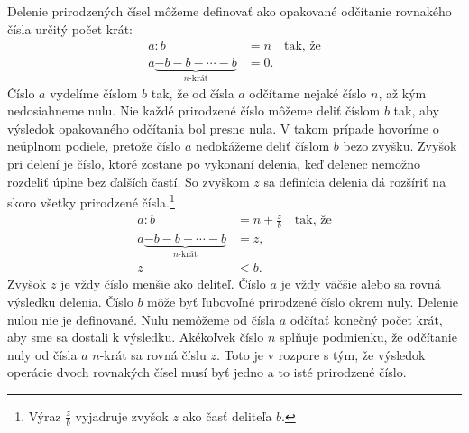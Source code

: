 \documentclass{report}
\begin{document}
Delenie prirodzených čísel môžeme definovať ako opakované odčítanie rovnakého čísla určitý počet krát:
\[
\begin{aligned}
  a : b &= n \quad \text{tak, že}\\
  a \underbrace{- b - b - \cdots - b}_{n\text{-krát}} &= 0.
\end{aligned}
\]
Číslo \(a\) vydelíme číslom \(b\) tak, že od čísla \(a\) odčítame nejaké číslo \(n\), až kým nedosiahneme nulu. Nie každé prirodzené číslo môžeme deliť číslom \(b\) tak, aby výsledok opakovaného odčítania bol presne nula. V takom prípade hovoríme o neúplnom podiele, pretože číslo \(a\) nedokážeme deliť číslom \(b\) bezo zvyšku. Zvyšok pri delení je číslo, ktoré zostane po vykonaní delenia, keď delenec nemožno rozdeliť úplne bez ďalších častí. So zvyškom \(z\) sa definícia delenia dá rozšíriť na skoro všetky prirodzené čísla.\footnote{Výraz \(\frac{z}{b}\) vyjadruje zvyšok \(z\) ako časť deliteľa \(b\).}
\[
\begin{aligned}
  a : b &= n + \frac{z}{b} \quad \text{tak, že}\\
  a \underbrace{- b - b - \cdots - b}_{n\text{-krát}} &= z, \\
  z &< b.
\end{aligned}
\]
Zvyšok \(z\) je vždy číslo menšie ako deliteľ. Číslo \(a\) je vždy väčšie alebo sa rovná výsledku delenia. Číslo \(b\) môže byť ľubovoľné prirodzené číslo okrem nuly. Delenie nulou nie je definované. Nulu nemôžeme od čísla \(a\) odčítať konečný počet krát, aby sme sa dostali k výsledku. Akékoľvek číslo \(n\) splňuje podmienku, že odčítanie nuly od čísla \(a\) \(n\)-krát sa rovná číslu \(z\). Toto je v rozpore s tým, že výsledok operácie dvoch rovnakých čísel musí byť jedno a to isté prirodzené číslo.
\end{document}
